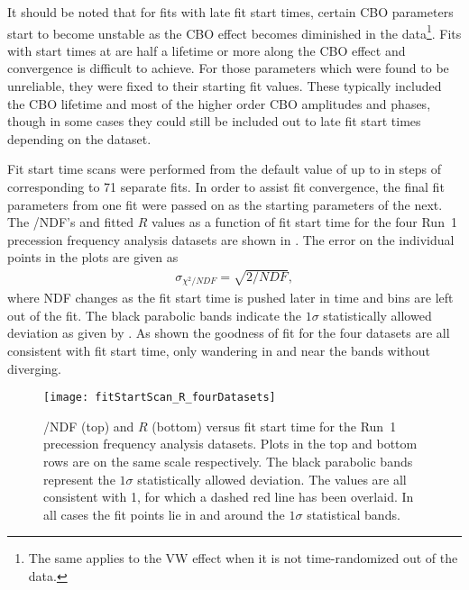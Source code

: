 It should be noted that for fits with late fit start times, certain CBO parameters start to become unstable as the CBO effect becomes diminished in the data\footnote{The same applies to the VW effect when it is not time-randomized out of the data.}. Fits with start times at  are half a lifetime or more along the CBO effect and convergence is difficult to achieve. For those parameters which were found to be unreliable, they were fixed to their starting fit values. These typically included the CBO lifetime and most of the higher order CBO amplitudes and phases, though in some cases they could still be included out to late fit start times depending on the dataset.


Fit start time scans were performed from the default value of  up to  in steps of  corresponding to 71 separate fits. In order to assist fit convergence, the final fit parameters from one fit were passed on as the starting parameters of the next. The \chisq/NDF's and fitted $R$ values as a function of fit start time for the four Run~1 precession frequency analysis datasets are shown in . The error on the individual points in the \chisq plots are given as 
  \begin{align}
    \sigma_{\chi^{2}/NDF} = \sqrt{2/NDF},
  \end{align}
where NDF changes as the fit start time is pushed later in time and bins are left out of the fit. The black parabolic bands indicate the $1\sigma$ statistically allowed deviation as given by . As shown the goodness of fit for the four datasets are all consistent with fit start time, only wandering in and near the bands without diverging.


\begin{landscape}
\begin{figure}
    \centering
    \texttt{[image: fitStartScan\_R\_fourDatasets]}
    \caption[\chisq/NDF and $R$ versus fit start time]{\chisq/NDF (top) and $R$ (bottom) versus fit start time for the Run~1 precession frequency analysis datasets. Plots in the top and bottom rows are on the same scale respectively. The black parabolic bands represent the $1\sigma$ statistically allowed deviation. The \chisq values are all consistent with 1, for which a dashed red line has been overlaid. In all cases the fit points lie in and around the $1\sigma$ statistical bands.}
    \label{fig:fitStartTime_chi2_and_R}
\end{figure}
\end{landscape}


